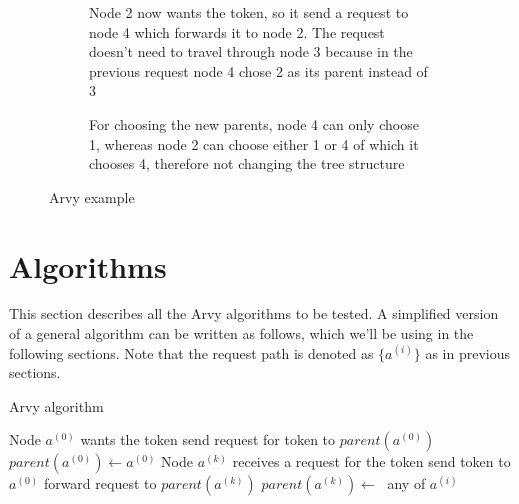 \documentclass[a4paper, oneside]{discothesis}
\begin{document}
\begin{figure}[]
\begin{subfigure}[t]{0.5\textwidth}
\centering
{}
\caption{Node 2 now wants the token, so it send a request to node 4 which forwards it to node 2. The request doesn't need to travel through node 3 because in the previous request node 4 chose 2 as its parent instead of 3}
\end{subfigure}
\quad
\begin{subfigure}[t]{0.5\textwidth}
\centering
{}
\caption{For choosing the new parents, node 4 can only choose 1, whereas node 2 can choose either 1 or 4 of which it chooses 4, therefore not changing the tree structure}
\end{subfigure}
\caption{Arvy example}
\label{fig:arvy}
\end{figure}


\chapter{Algorithms}

This section describes all the Arvy algorithms to be tested. A simplified version of a general algorithm can be written as follows, which we'll be using in the following sections. Note that the request path is denoted as $\{a^{(i)}\}$ as in previous sections.

\begin{algorithm}
\caption{Arvy algorithm}
\label{arvyalg}
\begin{algorithmic}
\Comment Node $a^{(0)}$ wants the token
    \State send request for token to $parent(a^{(0)})$
    \State $parent(a^{(0)})\gets a^{(0)}$
\EndIf
\EndFunction
{}
\Comment Node $a^{(k)}$ receives a request for the token
    \State send token to $a^{(0)}$
\Else
    \State forward request to $parent(a^{(k)})$
\EndIf
\State $parent(a^{(k)})\gets\;$
\EndFunction
{}
\State\Return any of $a^{(i)}$
\EndFunction
\end{algorithmic}
\end{algorithm}
\end{document}
